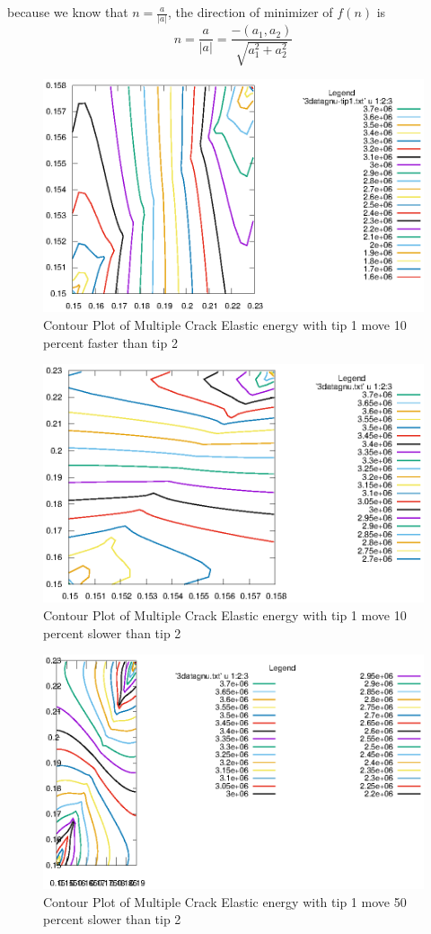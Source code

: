 \documentclass[a4paper,11pt]{article}
\begin{document}
because we know that $n=\frac{a}{|a|}$, the direction of minimizer of $f(n)$ is
\begin{equation}
n = \frac{a}{|a|} = \frac{-(a_1,a_2)}{\sqrt{a_1^2 + a_2^2}}
\end{equation}
\begin{figure}[h]
	\centering
	\includegraphics[width=0.7\linewidth]{picture/conference/elasticdouble-tip1}
	\caption{Contour Plot of Multiple Crack Elastic energy with tip 1 move 10 percent faster than tip 2}
	\label{fig:elasticdouble-tip1}
\end{figure}
\begin{figure}[h]
	\centering
	\includegraphics[width=0.7\linewidth]{picture/conference/elasticdouble-tip2}
	\caption{Contour Plot of Multiple Crack Elastic energy with tip 1 move 10 percent slower than tip 2}
	\label{fig:elasticdouble-tip2}
\end{figure}
\begin{figure}[h]
	\centering
	\includegraphics[width=0.7\linewidth]{picture/conference/elasticdouble-tip105}
	\caption{Contour Plot of Multiple Crack Elastic energy with tip 1 move 50 percent slower than tip 2}
	\label{fig:elasticdouble-tip105}
\end{figure}
\iffalse
\end{document}
